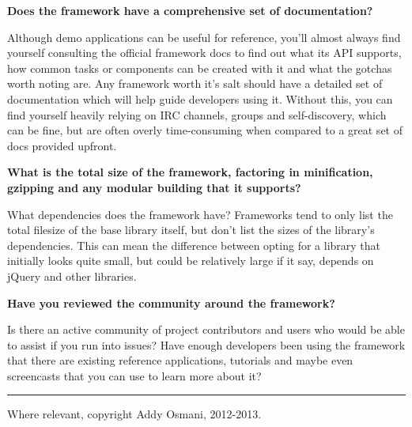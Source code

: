 \documentclass[9pt]{book}
\begin{document}
\textbf{Does the framework have a comprehensive set of documentation?}

Although demo applications can be useful for reference, you'll almost
always find yourself consulting the official framework docs to find out
what its API supports, how common tasks or components can be created
with it and what the gotchas worth noting are. Any framework worth it's
salt should have a detailed set of documentation which will help guide
developers using it. Without this, you can find yourself heavily relying
on IRC channels, groups and self-discovery, which can be fine, but are
often overly time-consuming when compared to a great set of docs
provided upfront.

\textbf{What is the total size of the framework, factoring in
minification, gzipping and any modular building that it supports?}

What dependencies does the framework have? Frameworks tend to only list
the total filesize of the base library itself, but don't list the sizes
of the library's dependencies. This can mean the difference between
opting for a library that initially looks quite small, but could be
relatively large if it say, depends on jQuery and other libraries.

\textbf{Have you reviewed the community around the framework?}

Is there an active community of project contributors and users who would
be able to assist if you run into issues? Have enough developers been
using the framework that there are existing reference applications,
tutorials and maybe even screencasts that you can use to learn more
about it?

\begin{center}\rule{3in}{0.4pt}\end{center}

Where relevant, copyright Addy Osmani, 2012-2013.
\end{document}
